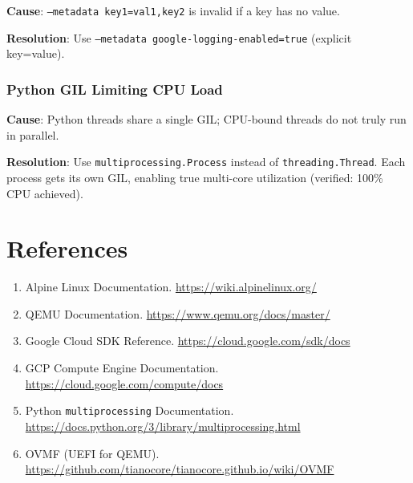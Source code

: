 \documentclass[12pt,a4paper]{article}
\begin{document}
\textbf{Cause}: \texttt{--metadata key1=val1,key2} is invalid if a key has no value.

\textbf{Resolution}: Use \texttt{--metadata google-logging-enabled=true} (explicit key=value).

\subsubsection{Python GIL Limiting CPU Load}

\textbf{Cause}: Python threads share a single GIL; CPU-bound threads do not truly run in parallel.

\textbf{Resolution}: Use \texttt{multiprocessing.Process} instead of \texttt{threading.Thread}.
Each process gets its own GIL, enabling true multi-core utilization (verified: 100\% CPU achieved).

\section*{References}

\begin{enumerate}
    \item Alpine Linux Documentation. \url{https://wiki.alpinelinux.org/}
    \item QEMU Documentation. \url{https://www.qemu.org/docs/master/}
    \item Google Cloud SDK Reference. \url{https://cloud.google.com/sdk/docs}
    \item GCP Compute Engine Documentation. \url{https://cloud.google.com/compute/docs}
    \item Python \texttt{multiprocessing} Documentation. \url{https://docs.python.org/3/library/multiprocessing.html}
    \item OVMF (UEFI for QEMU). \url{https://github.com/tianocore/tianocore.github.io/wiki/OVMF}
\end{enumerate}
\end{document}
